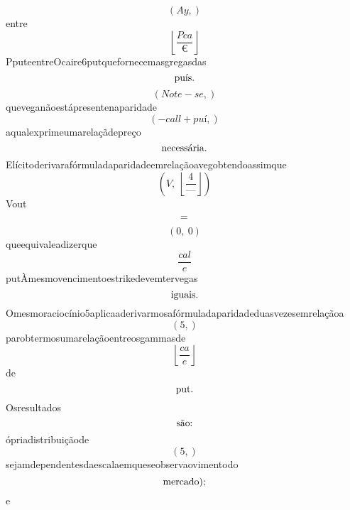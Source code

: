 \documentclass{article}
\begin{document}
\begin{equation}
\left( Ay,\right)
\end{equation}entre\begin{equation}
\left\lfloor{\frac{Pca}{€}}\right\rfloor
\end{equation}PputeentreOcaire6putquefornecemasgregasdas\begin{equation}
$puís.$
\end{equation}\begin{equation}
\left( Note - se,\right)
\end{equation}queveganãoestápresentenaparidade\begin{equation}
\left( - call + puí,\right)
\end{equation}aqualexprimeumarelaçãdepreço\begin{equation}
$necessária.$
\end{equation}Elícitoderivarafórmuladaparidadeemrelaçãoavegobtendoassimque\begin{equation}
\left( V, \  \left\lfloor{\frac{4}{—}}\right\rfloor\right)
\end{equation}Vout\begin{equation}
$=$
\end{equation}\begin{equation}
\left( 0, \  0\right)
\end{equation}queequivaleadizerque\begin{equation}
\frac{cal}{e}
\end{equation}putÀmesmovencimentoestrikedevemtervegas\begin{equation}
$iguais.$
\end{equation}Omesmoraciocínio5aplicaaderivarmosafórmuladaparidadeduasvezesemrelaçãoa\begin{equation}
\left( 5,\right)
\end{equation}parobtermosumarelaçãoentreosgammasde\begin{equation}
\left\lfloor{\frac{ca}{e}}\right\rfloor
\end{equation}de\begin{equation}
$put.$
\end{equation}Osresultados\begin{equation}
$são:$
\end{equation}ópriadistribuiçãode\begin{equation}
\left( 5,\right)
\end{equation}sejamdependentesdaescalaemqueseobservaovimentodo\begin{equation}
$mercado);$
\end{equation}e\begin{equation}

\end{equation}
\end{document}
